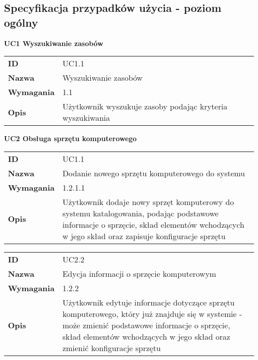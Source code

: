 \subsection{Specyfikacja przypadków użycia - poziom ogólny}

\vspace{.03\textheight}
\begin{center}
  {\Large\bf UC1 Wyszukiwanie zasobów} \\
\end{center}

\vspace{.02\textheight}

\begin{tabular}{p{}p{}}
\hfill {\bf ID} & UC1.1 \\
\hfill {\bf Nazwa} & Wyszukiwanie zasobów \\
\hfill {\bf Wymagania} & 1.1 \\
\hfill {\bf Opis} & Użytkownik wyszukuje zasoby podając kryteria wyszukiwania \\
\end{tabular}

\vspace{.03\textheight}
\begin{center}
  {\Large\bf UC2 Obsługa sprzętu komputerowego} \\
\end{center}
\vspace{.02\textheight}

\begin{tabular}{p{}p{}}
\hfill {\bf ID} & UC1.1 \\
\hfill {\bf Nazwa} & Dodanie nowego sprzętu komputerowego do systemu \\
\hfill {\bf Wymagania} & 1.2.1.1\\
\hfill {\bf Opis} & Użytkownik dodaje nowy sprzęt komputerowy do systemu katalogowania, podając podstawowe informacje o sprzęcie, skład elementów wchodzących w jego skład oraz zapisuje konfiguracje sprzętu \\
\end{tabular}

\vspace{.05\textheight}

\begin{tabular}{p{}p{}}
\hfill {\bf ID} & UC2.2 \\
\hfill {\bf Nazwa} & Edycja informacji o sprzęcie komputerowym \\
\hfill {\bf Wymagania} & 1.2.2 \\
\hfill {\bf Opis} & Użytkownik edytuje informacje dotyczące sprzętu komputerowego, który już znajduje się w systemie - może zmienić podstawowe informacje o sprzęcie, skład elementów wchodzących w jego skład oraz zmienić konfiguracje sprzętu \\
\end{tabular}

